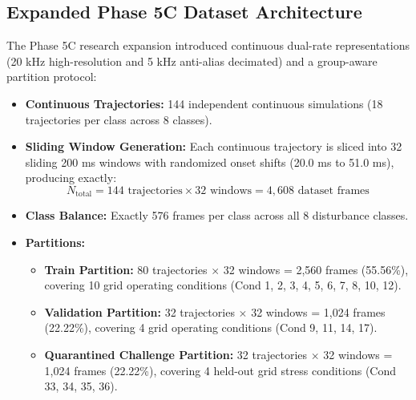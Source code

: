 \documentclass[12pt,a4paper]{report}
\begin{document}
\subsection{Expanded Phase 5C Dataset Architecture}
The Phase 5C research expansion introduced continuous dual-rate representations (20 kHz high-resolution and 5 kHz anti-alias decimated) and a group-aware partition protocol:
\begin{itemize}
    \item \textbf{Continuous Trajectories:} 144 independent continuous simulations (18 trajectories per class across 8 classes).
    \item \textbf{Sliding Window Generation:} Each continuous trajectory is sliced into 32 sliding 200 ms windows with randomized onset shifts (20.0 ms to 51.0 ms), producing exactly:
    \begin{equation}
    N_{\text{total}} = 144 \text{ trajectories} \times 32 \text{ windows} = 4,608 \text{ dataset frames}
    \end{equation}
    \item \textbf{Class Balance:} Exactly 576 frames per class across all 8 disturbance classes.
    \item \textbf{Partitions:}
    \begin{itemize}
        \item \textbf{Train Partition:} 80 trajectories $\times$ 32 windows = 2,560 frames (55.56\%), covering 10 grid operating conditions (Cond 1, 2, 3, 4, 5, 6, 7, 8, 10, 12).
        \item \textbf{Validation Partition:} 32 trajectories $\times$ 32 windows = 1,024 frames (22.22\%), covering 4 grid operating conditions (Cond 9, 11, 14, 17).
        \item \textbf{Quarantined Challenge Partition:} 32 trajectories $\times$ 32 windows = 1,024 frames (22.22\%), covering 4 held-out grid stress conditions (Cond 33, 34, 35, 36).
    \end{itemize}
\end{itemize}
\end{document}
